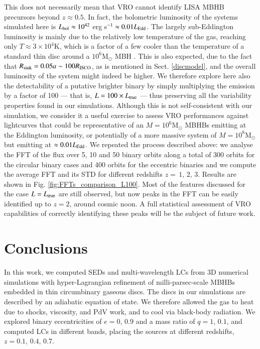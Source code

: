 \documentclass{aa}
\begin{document}
This does not necessarily mean that VRO cannot identify LISA MBHB precursors beyond $z\approx 0.5$. In fact, the bolometric luminosity of the systems simulated here is $L_{\rm bol}\approx 10^{42}$ erg s$^{-1}\approx 0.01 L_{\rm Edd}$. The largely sub-Eddington luminosity is mainly due to the relatively low temperature of the gas, reaching only $T\approx 3\times 10^4$K, which is a factor of a few cooler than the temperature of a standard thin disc around a $10^6$M$_\odot$ MBH \citep{2002apa..book.....F}. This is also expected, due to the fact that $R_{\rm sink}=0.05a \sim 100 R_{\rm ISCO}$, as is mentioned in Sect. \ref{discmodel}, and the overall luminosity of the system might indeed be higher.
We therefore explore here also the detectability of a putative brighter binary by simply multiplying the emission by a factor of 100 — that is, $L=100 \times L_{\rm true}$ — thus preserving all the variability properties found in our simulations. Although this is not self-consistent with our simulation, we consider it a useful exercise to assess VRO performances against lightcurves that could be representative of an $M=10^6$M$_\odot$ MBHBs emitting at the Eddington luminosity, or potentially of a more massive system of $M=10^8$M$_\odot$ but emitting at $\approx 0.01 L_{\rm Edd}$.
We repeated the process described above: we analyse the FFT of the flux over 5, 10 and 50 binary orbits along a total of 300 orbits for the circular binary cases and 400 orbits for the eccentric binaries and we compute the average FFT and its STD for different redshifts $z =\, 1, \,2, \,3$. Results are shown in Fig. \ref{fig:FFTs_comparison_L100}. Most of the features discussed for the case $L=L_{\rm true}$ are still observed, but now peaks in the FFT can be easily identified up to $z=2$, around cosmic noon. A full statistical assessment of VRO capabilities of correctly identifying these peaks will be the subject of future work. 




\section{Conclusions}
\label{sec:conclusions}

In this work, we computed SEDs and multi-wavelength LCs from 3D numerical simulations with hyper-Lagrangian refinement of milli-parsec-scale MBHBs embedded in thin circumbinary gaseous discs. The discs in our simulations are described by an adiabatic equation of state. We therefore allowed the gas to heat due to shocks, viscosity, and PdV work, and to cool via black-body radiation.
We explored binary eccentricities of $e=0, \, 0.9$ and a mass ratio of $q=1,\, 0.1$, and computed LCs in different bands, placing the sources at different redshifts, $z=0.1, \,0.4, \, 0.7$. 
\end{document}

